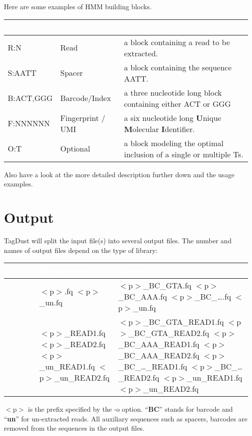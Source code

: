 \documentclass[11pt,a4paper,oneside]{book}
\begin{document}
Here are some examples of HMM building blocks. \begin{center}
\begin{tabular}{| l | l | p{12cm}|}
\hline
\rowcolor{blue} \textcolor{white}{\scshape Example}		&\textcolor{white}{\scshape Type}		&	\textcolor{white}{\scshape Description}\\ \hline
R:N & Read  & a block containing a read to be extracted.\\
S:AATT & Spacer & a block containing the sequence AATT.\\ 
B:ACT,GGG & Barcode/Index & a three nucleotide long block containing either ACT or GGG\\ 
F:NNNNNN & Fingerprint / UMI & a six nucleotide long {\bf U}nique {\bf M}olecular {\bf I}dentifier.\\ 
O:T  & Optional & a block modeling the optimal inclusion of a single or multiple Ts.\\
\hline
\end{tabular}
\end{center}

Also have a look at the more detailed description further down and the usage examples. 


\newpage 
\section{Output}
TagDust will split the input file(s) into several output files. The number and names of output files depend on the type of library: 


\begin{center}
\begin{tabular}{ | c | p{4.5cm} | p{4.5cm}|}
\hline
 \textcolor{white}{\scshape }		&\cellcolor{blue}\textcolor{white}{\scshape No barcodes}		&	\cellcolor{blue}\textcolor{white}{\scshape Barcodes}\\ \hline
\cellcolor{blue}\textcolor{white}{\scshape Single End} & $<$p$>$.fq \newline $<$p$>$\_un.fq & $<$p$>$\_BC\_GTA.fq $<$p$>$\_BC\_AAA.fq $<$p$>$\_BC\_\dots.fq \newline $<$p$>$\_un.fq \\
\cellcolor{blue}\textcolor{white}{\scshape Paired End} &  $<$p$>$\_READ1.fq $<$p$>$\_READ2.fq $<$p$>$\_un\_READ1.fq $<$p$>$\_un\_READ2.fq   & $<$p$>$\_BC\_GTA\_READ1.fq $<$p$>$\_BC\_GTA\_READ2.fq  $<$p$>$\_BC\_AAA\_READ1.fq $<$p$>$\_BC\_AAA\_READ2.fq $<$p$>$\_BC\_\dots\_READ1.fq $<$p$>$\_BC\_\dots\_READ2.fq $<$p$>$\_un\_READ1.fq $<$p$>$\_un\_READ2.fq\\ 
\hline
\end{tabular}
\end{center}
$<$p$>$ is the prefix specified by the -o option. ``{\bf BC}'' stands for barcode and ``{\bf un}'' for un-extracted reads. All auxiliary sequences such as spacers, barcodes are removed from the sequences in the output files. 
\end{document}
